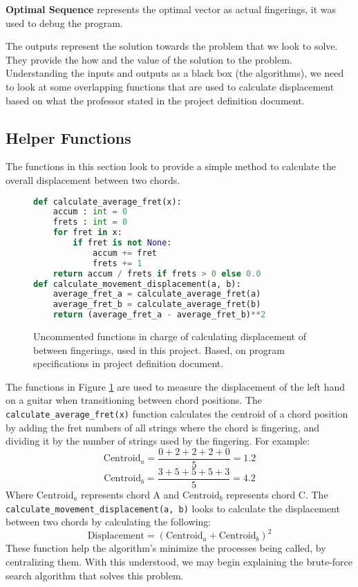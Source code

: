 \documentclass[conference]{IEEEtran}
\begin{document}
\textbf{Optimal Sequence} represents the optimal vector as actual fingerings, it was used to debug the program.

\indent The outputs represent the solution towards the problem that we look to solve. They provide the how and the value of the solution to the problem. Understanding the inputs and outputs as a black box (the algorithms), we need to look at some overlapping functions that are used to calculate displacement based on what the professor stated in the project definition document.
\subsection{Helper Functions}
The functions in this section look to provide a simple method to calculate the overall displacement between two chords. 
\begin{figure}[H]
\begin{lstlisting}[language=Python]
def calculate_average_fret(x):
    accum : int = 0
    frets : int = 0
    for fret in x:
        if fret is not None:
            accum += fret
            frets += 1
    return accum / frets if frets > 0 else 0.0
def calculate_movement_displacement(a, b):
    average_fret_a = calculate_average_fret(a)
    average_fret_b = calculate_average_fret(b)
    return (average_fret_a - average_fret_b)**2    
\end{lstlisting}
\caption{Uncommented functions in charge of calculating displacement of between fingerings, used in this project. Based, on program specifications in project definition document.}
\label{fig:DisplacementFunctions}
\end{figure}
The functions in Figure \ref{fig:DisplacementFunctions} are used to measure the displacement of the left hand on a guitar when transitioning between chord positions. The \lstinline|calculate_average_fret(x)| function calculates the centroid of a chord position by adding the fret numbers of all strings where the chord is fingering, and dividing it by the number of strings used by the fingering. For example: 
\[ \text{Centroid}_a  = \frac{0+2+2+2+0}{5} = 1.2 \] 
\[ \text{Centroid}_b = \frac{3+5+5+5+3}{5} = 4.2 \]
\indent Where \( \text{Centroid}_a \) represents chord A and \(\text{Centroid}_b \) represents chord C. 
\newline 
\indent The \lstinline|calculate_movement_displacement(a, b)| looks to calculate the displacement between two chords by calculating the following:
\[
\text{Displacement} = (\text{Centroid}_a + \text{Centroid}_b)^2
\]
\indent These function help the algorithm's minimize the processes being called, by centralizing them. With this understood, we may begin explaining the brute-force search algorithm that solves this problem.
\end{document}
